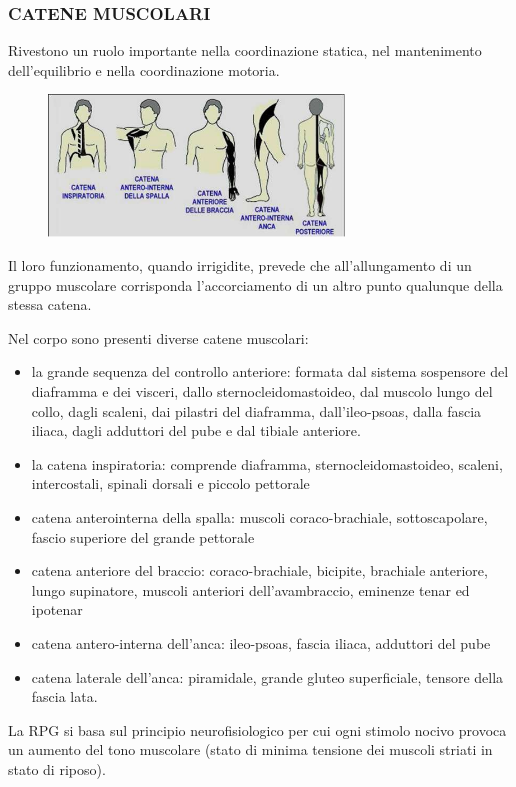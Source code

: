  
\subsubsection{CATENE MUSCOLARI}

 

Rivestono un ruolo importante nella coordinazione statica, nel
mantenimento dell'equilibrio e nella coordinazione motoria.

\begin{figure}[!ht]
\centering
	\includegraphics[width=0.7\textwidth]{027/image1.png}
\end{figure}

Il loro funzionamento, quando irrigidite, prevede che all'allungamento
di un gruppo muscolare corrisponda l'accorciamento di un altro punto
qualunque della stessa catena.

Nel corpo sono presenti diverse catene muscolari:
\begin{itemize}
\item 
 la grande sequenza del controllo anteriore: formata dal sistema
sospensore del diaframma e dei visceri, dallo sternocleidomastoideo, dal
muscolo lungo del collo, dagli scaleni, dai pilastri del diaframma,
dall'ileo-psoas, dalla fascia iliaca, dagli adduttori del pube e dal
tibiale anteriore.
\item 
la catena inspiratoria: comprende diaframma, sternocleidomastoideo,
scaleni, intercostali, spinali dorsali e piccolo pettorale
\item 
catena anterointerna della spalla: muscoli coraco-brachiale,
sottoscapolare, fascio superiore del grande pettorale
\item 
catena anteriore del braccio: coraco-brachiale, bicipite, brachiale
anteriore, lungo supinatore, muscoli anteriori dell'avambraccio,
eminenze tenar ed ipotenar
\item 
 catena antero-interna dell'anca: ileo-psoas, fascia iliaca, adduttori
del pube
\item 
catena laterale dell'anca: piramidale, grande gluteo superficiale,
tensore della fascia lata.
\end{itemize}
La RPG si basa sul principio neurofisiologico per cui ogni stimolo
nocivo provoca un aumento del tono muscolare (stato di minima tensione
dei muscoli striati in stato di riposo).

